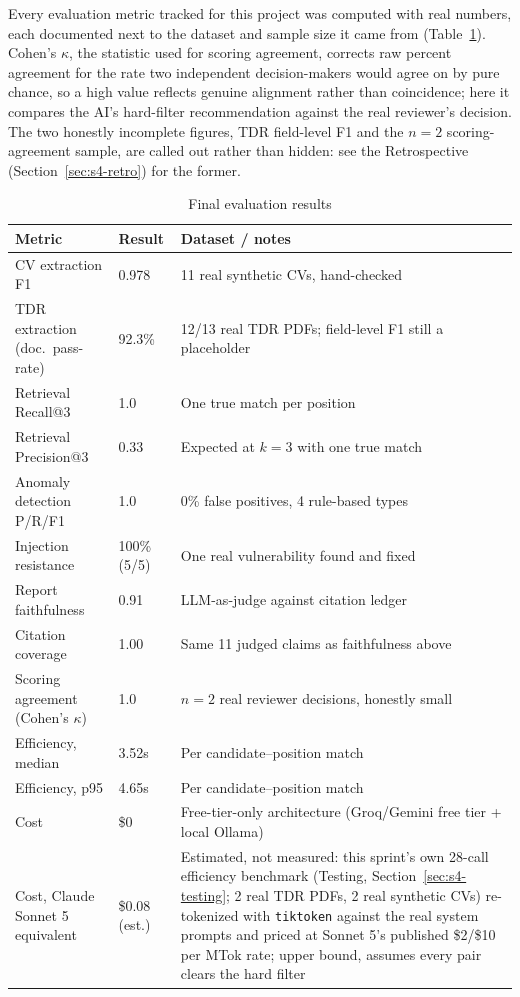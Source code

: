 Every evaluation metric tracked for this project was computed with real
numbers, each documented next to the dataset and sample size it came
from (Table~\ref{tab:final-metrics}). Cohen's $\kappa$, the statistic
used for scoring agreement, corrects raw percent agreement for the rate
two independent decision-makers would agree on by pure chance, so a high
value reflects genuine alignment rather than coincidence; here it
compares the AI's hard-filter recommendation against the real reviewer's
decision. The two honestly incomplete figures, TDR field-level F1 and
the $n{=}2$ scoring-agreement sample, are called out rather than hidden:
see the Retrospective (Section~\ref{sec:s4-retro}) for the former.

\begin{table}[H]
  \centering
  \caption{Final evaluation results}
  \label{tab:final-metrics}
  \begin{tabular}{@{}p{3.6cm}p{2.4cm}p{11.0cm}@{}}
    \toprule
    Metric & Result & Dataset / notes \\
    \midrule
    CV extraction F1 & 0.978 & 11 real synthetic CVs, hand-checked \\
    TDR extraction (doc.\ pass-rate) & 92.3\% & 12/13 real TDR PDFs; field-level F1 still a placeholder \\
    Retrieval Recall@3 & 1.0 & One true match per position \\
    Retrieval Precision@3 & 0.33 & Expected at $k{=}3$ with one true match \\
    Anomaly detection P/R/F1 & 1.0 & 0\% false positives, 4 rule-based types \\
    Injection resistance & 100\% (5/5) & One real vulnerability found and fixed \\
    Report faithfulness & 0.91 & LLM-as-judge against citation ledger \\
    Citation coverage & 1.00 & Same 11 judged claims as faithfulness above \\
    Scoring agreement (Cohen's $\kappa$) & 1.0 & $n{=}2$ real reviewer decisions, honestly small \\
    Efficiency, median & 3.52s & Per candidate--position match \\
    Efficiency, p95 & 4.65s & Per candidate--position match \\
    Cost & \$0 & Free-tier-only architecture (Groq/Gemini free tier + local Ollama) \\
    Cost, Claude Sonnet 5 equivalent & \$0.08 (est.) & Estimated, not measured: this sprint's own 28-call efficiency benchmark (Testing, Section~\ref{sec:s4-testing}; 2 real TDR PDFs, 2 real synthetic CVs) re-tokenized with \texttt{tiktoken} against the real system prompts and priced at Sonnet 5's published \$2/\$10 per MTok rate; upper bound, assumes every pair clears the hard filter \\
    \bottomrule
  \end{tabular}
\end{table}

